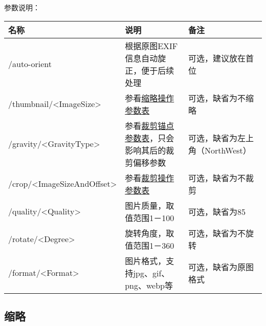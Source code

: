 \documentclass[11pt, oneside]{book}
\newcommand{\qpara}[1]{
\vspace{0.3em}
\noindent
#1\par
\vspace{0.3em}
}
\newcommand{\qtable}[1]{\footnotesize\vspace{0.5em}#1\vspace{0.5em}\normalsize}
\begin{document}
\qpara{参数说明：}
\qtable{
\def\arraystretch{2}
\begin{tabular}{|l|p{13em}|p{10em}|}
\hline
名称 & 说明 & 备注\\
\hline
/auto-orient & 根据原图EXIF信息自动旋正，便于后续处理 & 可选，建议放在首位 \\
\hline
/thumbnail/\textless ImageSize\textgreater & 参看\hyperref[thumbnail-spec]{缩略操作参数表} & 可选，缺省为不缩略 \\
\hline
/gravity/\textless GravityType\textgreater & 参看\hyperref[crop-anchor-spec]{裁剪锚点参数表}，只会影响其后的裁剪偏移参数 & 可选，缺省为左上角（NorthWest） \\
\hline
/crop/\textless ImageSizeAndOffset\textgreater & 参看\hyperref[crop-spec]{裁剪操作参数表} & 可选，缺省为不裁剪 \\
\hline
/quality/\textless Quality\textgreater & 图片质量，取值范围1－100 & 可选，缺省为85 \\
\hline
/rotate/\textless Degree\textgreater & 旋转角度，取值范围1－360 & 可选，缺省为不旋转 \\
\hline
/format/\textless Format\textgreater & 图片格式，支持jpg、gif、png、webp等 & 可选，缺省为原图格式 \\
\hline
\end{tabular}
}

\clearpage

\subsection{缩略}
\end{document}
